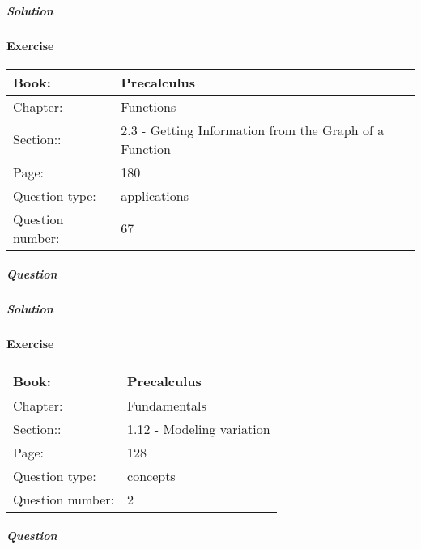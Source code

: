 \documentclass{article}
\begin{document}
            \subparagraph{Solution}
            
            
            \newpage
            \paragraph{Exercise}\par
            \noindent
            \begin{tabularx}{1\textwidth}{
                    p{}
                    p{}
                }
                \toprule
                Book: & Precalculus
                \\
                \midrule
                Chapter: & Functions
                \\
                \midrule
                Section:: & 2.3 - Getting Information from the Graph of a Function
                \\
                \midrule
                Page: & 180
                \\
                \midrule
                Question type: & applications
                \\
                \midrule
                Question number: & 67
                \\
                \bottomrule
            \end{tabularx}
            \subparagraph{Question}
            
            \subparagraph{Solution}
            
            
            \newpage
            \paragraph{Exercise}\par
            \noindent
            \begin{tabularx}{1\textwidth}{
                    p{}
                    p{}
                }
                \toprule
                Book: & Precalculus
                \\
                \midrule
                Chapter: & Fundamentals
                \\
                \midrule
                Section:: & 1.12 - Modeling variation
                \\
                \midrule
                Page: & 128
                \\
                \midrule
                Question type: & concepts
                \\
                \midrule
                Question number: & 2
                \\
                \bottomrule
            \end{tabularx}
            \subparagraph{Question}
            
\end{document}
